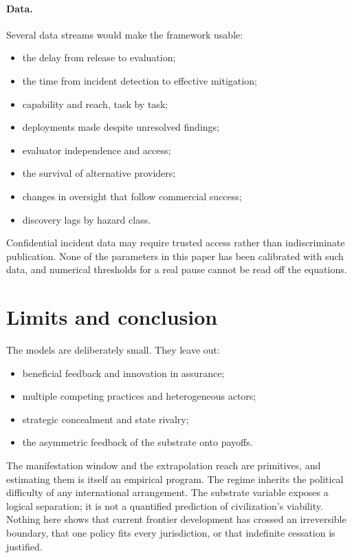 \documentclass[11pt]{article}
\theoremstyle{plain}
\theoremstyle{definition}
\begin{document}
\paragraph{Data.} Several data streams would make the framework usable:
\begin{itemize}[leftmargin=*]
\item the delay from release to evaluation;
\item the time from incident detection to effective mitigation;
\item capability and reach, task by task;
\item deployments made despite unresolved findings;
\item evaluator independence and access;
\item the survival of alternative providers;
\item changes in oversight that follow commercial success;
\item discovery lags by hazard class.
\end{itemize}
Confidential incident data may require trusted access rather than indiscriminate publication. None of the parameters in this paper has been calibrated with such data, and numerical thresholds for a real pause cannot be read off the equations.

\section{Limits and conclusion}\label{sec:conclusion}

The models are deliberately small. They leave out:
\begin{itemize}[leftmargin=*]
\item beneficial feedback and innovation in assurance;
\item multiple competing practices and heterogeneous actors;
\item strategic concealment and state rivalry;
\item the asymmetric feedback of the substrate onto payoffs.
\end{itemize}
The manifestation window and the extrapolation reach are primitives, and estimating them is itself an empirical program. The regime inherits the political difficulty of any international arrangement. The substrate variable exposes a logical separation; it is not a quantified prediction of civilization's viability. Nothing here shows that current frontier development has crossed an irreversible boundary, that one policy fits every jurisdiction, or that indefinite cessation is justified.
\end{document}
